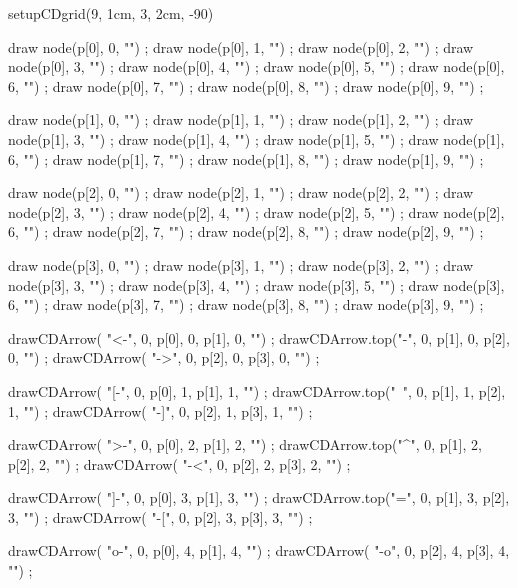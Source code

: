
\usemodule[commDiag]

\startMPpage

setupCDgrid(9, 1cm, 3, 2cm, -90)

draw node(p[0], 0, "") ;
draw node(p[0], 1, "") ;
draw node(p[0], 2, "") ;
draw node(p[0], 3, "") ;
draw node(p[0], 4, "") ;
draw node(p[0], 5, "") ;
draw node(p[0], 6, "") ;
draw node(p[0], 7, "") ;
draw node(p[0], 8, "") ;
draw node(p[0], 9, "") ;

draw node(p[1], 0, "") ;
draw node(p[1], 1, "") ;
draw node(p[1], 2, "") ;
draw node(p[1], 3, "") ;
draw node(p[1], 4, "") ;
draw node(p[1], 5, "") ;
draw node(p[1], 6, "") ;
draw node(p[1], 7, "") ;
draw node(p[1], 8, "") ;
draw node(p[1], 9, "") ;

draw node(p[2], 0, "") ;
draw node(p[2], 1, "") ;
draw node(p[2], 2, "") ;
draw node(p[2], 3, "") ;
draw node(p[2], 4, "") ;
draw node(p[2], 5, "") ;
draw node(p[2], 6, "") ;
draw node(p[2], 7, "") ;
draw node(p[2], 8, "") ;
draw node(p[2], 9, "") ;

draw node(p[3], 0, "") ;
draw node(p[3], 1, "") ;
draw node(p[3], 2, "") ;
draw node(p[3], 3, "") ;
draw node(p[3], 4, "") ;
draw node(p[3], 5, "") ;
draw node(p[3], 6, "") ;
draw node(p[3], 7, "") ;
draw node(p[3], 8, "") ;
draw node(p[3], 9, "") ;

drawCDArrow(   "<-", 0, p[0], 0, p[1], 0, "") ;
drawCDArrow.top("-", 0, p[1], 0, p[2], 0, "") ;
drawCDArrow(   "->", 0, p[2], 0, p[3], 0, "") ;

drawCDArrow(   "[-", 0, p[0], 1, p[1], 1, "") ;
drawCDArrow.top("~", 0, p[1], 1, p[2], 1, "") ;
drawCDArrow(   "-]", 0, p[2], 1, p[3], 1, "") ;

drawCDArrow(   ">-", 0, p[0], 2, p[1], 2, "") ;
drawCDArrow.top("^", 0, p[1], 2, p[2], 2, "") ;
drawCDArrow(   "-<", 0, p[2], 2, p[3], 2, "") ;

drawCDArrow(   "]-", 0, p[0], 3, p[1], 3, "") ;
drawCDArrow.top("=", 0, p[1], 3, p[2], 3, "") ;
drawCDArrow(   "-[", 0, p[2], 3, p[3], 3, "") ;

drawCDArrow(   "o-", 0, p[0], 4, p[1], 4, "") ;
drawCDArrow(   "-o", 0, p[2], 4, p[3], 4, "") ;


